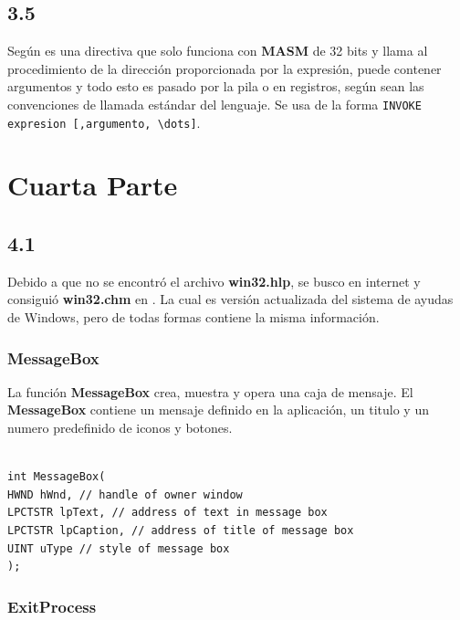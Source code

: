 \subsection*{3.5}
Según \cite{MicrosoftINVOKE} es una directiva que solo funciona con \textbf{MASM} de 32
bits y llama al procedimiento de la dirección proporcionada por la expresión,
puede contener argumentos y todo esto es pasado por la pila o en registros,
según sean las convenciones de llamada estándar del lenguaje. Se usa de la
forma \verb|INVOKE expresion [,argumento, \dots]|.

\section{Cuarta Parte}

\subsection*{4.1}

Debido a que no se encontró el archivo \textbf{win32.hlp}, se busco en
internet y consiguió \textbf{win32.chm} en \cite{laurencejackson.com}. La cual es versión
actualizada del sistema de ayudas de Windows, pero de todas formas contiene
la misma información.

\subsubsection*{MessageBox}

La función \textbf{MessageBox} crea, muestra y opera una caja de mensaje. El \textbf{MessageBox}
contiene un mensaje definido en la aplicación, un titulo y un numero predefinido
de iconos y botones.

\begin{BVerbatim}

int MessageBox(
HWND hWnd, // handle of owner window
LPCTSTR lpText, // address of text in message box
LPCTSTR lpCaption, // address of title of message box
UINT uType // style of message box
);

\end{BVerbatim}

\subsubsection*{ExitProcess}

